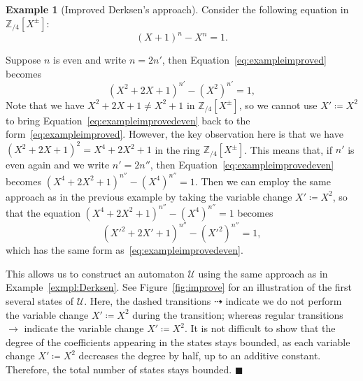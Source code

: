 \documentclass[letterpaper, 11pt, thm-restate]{article}
\numberwithin{equation}{section}
\newcommand{\Z}{\mathbb{Z}}
\newcommand{\mmU}{\mathscr{U}}
\theoremstyle{definition}
\theoremstyle{definition}
\newtheorem{exmpl}[thrm]{Example}
\theoremstyle{definition}
\begin{document}
\begin{exmpl}[Improved Derksen's approach]\label{exmpl:improved}
    Consider the following equation in $\Z_{/4}[X^{\pm}]$:
    \begin{equation}\label{eq:exampleimproved}
    (X+1)^n - X^n = 1.
    \end{equation}
    
    Suppose $n$ is even and write $n = 2n'$, then Equation~\eqref{eq:exampleimproved} becomes
    \begin{equation}\label{eq:exampleimprovedeven}
    (X^2+2X+1)^{n'} - (X^2)^{n'} = 1,
    \end{equation}
    Note that we have 
    $
    X^2 + 2X + 1 \neq  X^2 + 1
    $
    in $\Z_{/4}[X^{\pm}]$, so we cannot use $X' \coloneqq X^2$ to bring Equation~\eqref{eq:exampleimprovedeven} back to the form~\eqref{eq:exampleimproved}.
    However, the key observation here is that we have
    $
    (X^2+ 2X +1)^2 = X^4+ 2X^2 +1
    $
    in the ring $\Z_{/4}[X^{\pm}]$.
    This means that, if $n'$ is even again and we write $n' = 2n''$, then Equation~\eqref{eq:exampleimprovedeven} becomes $(X^4+2X^2+1)^{n''} - (X^4)^{n''} = 1$.    
    Then we can employ the same approach as in the previous example by taking the variable change $X' \coloneqq X^2$, so that the equation $(X^4+2X^2+1)^{n''} - (X^4)^{n''} = 1$ becomes
    \begin{equation}\label{eq:exampleimprovedfour}
    (X'^2+2X'+1)^{n''} - (X'^2)^{n''} = 1,
    \end{equation}
    which has the same form as~\eqref{eq:exampleimprovedeven}.
    
    This allows us to construct an automaton $\mmU$ using the same approach as in Example~\ref{exmpl:Derksen}.
    See Figure~\ref{fig:improve} for an illustration of the first several states of $\mmU$.
    Here, the dashed transitions $\dashrightarrow$ indicate we do not perform the variable change $X' \coloneqq X^2$ during the transition; whereas regular transitions $\longrightarrow$ indicate the variable change $X' \coloneqq X^2$.
    It is not difficult to show that the degree of the coefficients appearing in the states stays bounded, as each variable change $X' \coloneqq X^2$ decreases the degree by half, up to an additive constant. Therefore, the total number of states stays bounded.
    \hfill $\blacksquare$
\end{exmpl}
\end{document}
